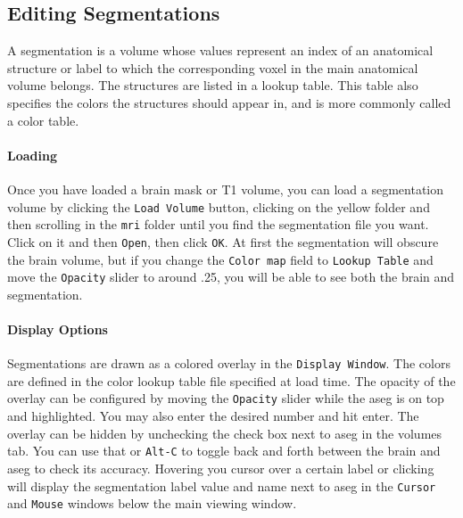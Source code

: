 \documentclass[paper=a4, fontsize=11pt]{scrartcl} %
\numberwithin{equation}{section} %
\numberwithin{figure}{section} %
\numberwithin{table}{section} %
\begin{document}
\subsection{Editing Segmentations}\label{ss:es} A segmentation is a volume whose values represent an index of an anatomical structure or label to which the corresponding voxel in the main anatomical volume belongs. The structures are listed in a lookup table. This table also specifies the colors the structures should appear in, and is more commonly called a color table.  
\paragraph{Loading}Once you have loaded a brain mask or T1 volume, you can load a segmentation volume by clicking the \texttt{Load Volume} button, clicking on the yellow folder and then scrolling in the \texttt{mri} folder until you find the segmentation file you want. Click on it and then \texttt{Open}, then click \texttt{OK}. At first the segmentation will obscure the brain volume, but if you change the \texttt{Color map} field to \texttt{Lookup Table} and move the \texttt{Opacity} slider to around .25, you will be able to see both the brain and segmentation.
\paragraph{Display Options} Segmentations are drawn as a colored overlay in the \texttt{Display Window}. The colors are defined in the color lookup table file specified at load time. The opacity of the overlay can be configured by moving the \texttt{Opacity} slider while the aseg is on top and highlighted. You may also enter the desired number and hit enter. The overlay can be hidden by unchecking the check box next to aseg in the volumes tab. You can use that or \texttt{Alt-C} to toggle back and forth between the brain and aseg to check its accuracy. Hovering you cursor over a certain label or clicking will display the segmentation label value and name next to aseg in the \texttt{Cursor} and \texttt{Mouse} windows below the main viewing window.
\end{document}
